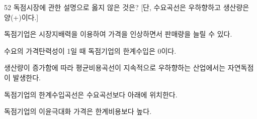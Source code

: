 \begin{question}{52}
독점시장에 관한 설명으로 옳지 않은 것은? [단, 수요곡선은 우하향하고 생산량은 양(+)이다.]
\begin{choices}
  \item 독점기업은 시장지배력을 이용하여 가격을 인상하면서 판매량을 늘릴 수 있다.
  \item 수요의 가격탄력성이 1일 때 독점기업의 한계수입은 0이다.
  \item 생산량이 증가함에 따라 평균비용곡선이 지속적으로 우하향하는 산업에서는 자연독점이 발생한다.
  \item 독점기업의 한계수입곡선은 수요곡선보다 아래에 위치한다.
  \item 독점기업의 이윤극대화 가격은 한계비용보다 높다.
\end{choices}
\end{question}

